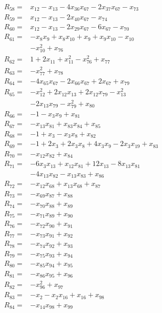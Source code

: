 \begin{align*}
R_{58}={}&x_{12} -x_{13} -4x_{36}x_{67} -2x_{37}x_{67} -x_{73}\\[3pt]
R_{59}={}&x_{12} -x_{13} -2x_{40}x_{67} -x_{74}\\[3pt]
R_{60}={}&x_{12} -x_{13} -2x_{29}x_{67} -6x_{67} -x_{70}\\[3pt]
R_{61}={}&-x_{8}x_{9} +x_{8}x_{10} +x_{9} +x_{9}x_{10} -x_{10}\\
&-x_{10}^{2} +x_{76}\\[3pt]
R_{62}={}&1 +2x_{11} +x_{11}^{2} -x_{76}^{2} +x_{77}\\[3pt]
R_{63}={}&-x_{77}^{2} +x_{78}\\[3pt]
R_{64}={}&-4x_{65}x_{67} -2x_{66}x_{67} +2x_{67} +x_{79}\\[3pt]
R_{65}={}&-x_{12}^{2} +2x_{12}x_{13} +2x_{12}x_{79} -x_{13}^{2}\\
&-2x_{13}x_{79} -x_{79}^{2} +x_{80}\\[3pt]
R_{66}={}&-1 -x_{3}x_{9} +x_{81}\\[3pt]
R_{67}={}&-x_{13}x_{81} +x_{83}x_{84} +x_{85}\\[3pt]
R_{68}={}&-1 +x_{3} -x_{3}x_{8} +x_{82}\\[3pt]
R_{69}={}&-1 +2x_{3} +2x_{3}x_{8} +4x_{3}x_{9} -2x_{3}x_{19} +x_{83}\\[3pt]
R_{70}={}&-x_{12}x_{82} +x_{84}\\[3pt]
R_{71}={}&-6x_{3}x_{13} +x_{12}x_{81} +12x_{13} -8x_{13}x_{81}\\
&-4x_{13}x_{82} -x_{13}x_{83} +x_{86}\\[3pt]
R_{72}={}&-x_{12}x_{68} +x_{13}x_{68} +x_{87}\\[3pt]
R_{73}={}&-x_{69}x_{87} +x_{88}\\[3pt]
R_{74}={}&-x_{70}x_{88} +x_{89}\\[3pt]
R_{75}={}&-x_{71}x_{89} +x_{90}\\[3pt]
R_{76}={}&-x_{72}x_{90} +x_{91}\\[3pt]
R_{77}={}&-x_{73}x_{91} +x_{92}\\[3pt]
R_{78}={}&-x_{74}x_{92} +x_{93}\\[3pt]
R_{79}={}&-x_{75}x_{93} +x_{94}\\[3pt]
R_{80}={}&-x_{85}x_{94} +x_{95}\\[3pt]
R_{81}={}&-x_{86}x_{95} +x_{96}\\[3pt]
R_{82}={}&-x_{96}^{2} +x_{97}\\[3pt]
R_{83}={}&-x_{2} -x_{2}x_{16} +x_{16} +x_{98}\\[3pt]
R_{84}={}&-x_{14}x_{98} +x_{99}\\[3pt]

\end{align*}
